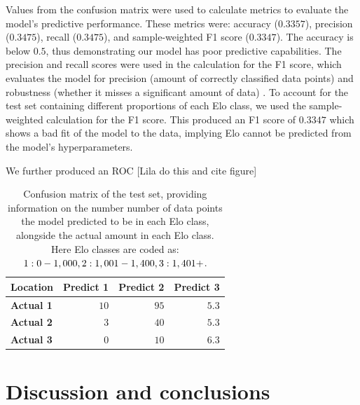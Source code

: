 \documentclass[10pt,a4paper]{article}
\begin{document}
\begin{multicols}{2}
Values from the confusion matrix were used to calculate metrics to evaluate the model's predictive performance. These metrics were: accuracy ($0.3357$), precision ($0.3475$), recall ($0.3475$), and sample-weighted F1 score ($0.3347$). The accuracy is below $0.5$, thus demonstrating our model has poor predictive capabilities. The precision and recall scores were used in the calculation for the F1 score, which evaluates the model for precision (amount of correctly classified data points) and robustness (whether it misses a significant amount of data) \cite{MetricsToEvaluateYourML}. To account for the test set containing different proportions of each Elo class, we used the sample-weighted calculation for the F1 score. This produced an F1 score of $0.3347$ which shows a bad fit of the model to the data, implying Elo cannot be predicted from the model's hyperparameters. \newline

We further produced an ROC [Lila do this and cite figure]

\begin{table}[H]
  \centering
  \caption{Confusion matrix of the test set, providing information on the number number of data points the model predicted to be in each Elo class, alongside the actual amount in each Elo class. Here Elo classes are coded as: $1: 0 - 1,000, \newline 2: 1,001 - 1,400, \newline 3: 1,401+$.}
  \label{tab:confusion_matrix}
    \begin{tabular}{lrrr}
        \toprule
        \textbf{Location}&\textbf{Predict 1}&\textbf{Predict 2}&\textbf{Predict 3}\\
        \midrule
        \textbf{Actual 1}&$10$&$ 95$&$5.3$\tabularnewline
        \textbf{Actual 2}&$ 3$&$ 40$&$5.3$\tabularnewline
        \textbf{Actual 3}&$ 0$&$ 10$&$6.3$\tabularnewline
        \hline
    \end{tabular}
\end{table}




\section{Discussion and conclusions}




\end{multicols}
\end{document}

